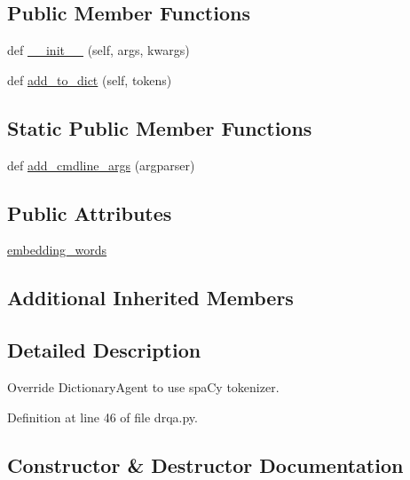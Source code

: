 \subsection*{Public Member Functions}
\begin{DoxyCompactItemize}
\item 
def \hyperlink{classparlai_1_1agents_1_1drqa_1_1drqa_1_1SimpleDictionaryAgent_ae21eeff2d5a918998ca8ea90279c9b07}{\+\_\+\+\_\+init\+\_\+\+\_\+} (self, args, kwargs)
\item 
def \hyperlink{classparlai_1_1agents_1_1drqa_1_1drqa_1_1SimpleDictionaryAgent_a5ccaf2bd28a50af2062ad2efd6a36e0e}{add\+\_\+to\+\_\+dict} (self, tokens)
\end{DoxyCompactItemize}
\subsection*{Static Public Member Functions}
\begin{DoxyCompactItemize}
\item 
def \hyperlink{classparlai_1_1agents_1_1drqa_1_1drqa_1_1SimpleDictionaryAgent_a43e40daa2e8260d919347a8e40ae3ced}{add\+\_\+cmdline\+\_\+args} (argparser)
\end{DoxyCompactItemize}
\subsection*{Public Attributes}
\begin{DoxyCompactItemize}
\item 
\hyperlink{classparlai_1_1agents_1_1drqa_1_1drqa_1_1SimpleDictionaryAgent_a26ce0c0cc3362b43219d488826c3550a}{embedding\+\_\+words}
\end{DoxyCompactItemize}
\subsection*{Additional Inherited Members}


\subsection{Detailed Description}
\begin{DoxyVerb}Override DictionaryAgent to use spaCy tokenizer.
\end{DoxyVerb}
 

Definition at line 46 of file drqa.\+py.



\subsection{Constructor \& Destructor Documentation}
\mbox{\label{classparlai_1_1agents_1_1drqa_1_1drqa_1_1SimpleDictionaryAgent_ae21eeff2d5a918998ca8ea90279c9b07}} 

